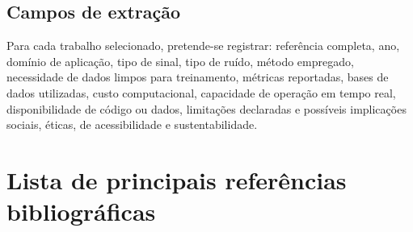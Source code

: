 \subsection{Campos de extração}

Para cada trabalho selecionado, pretende-se registrar: referência completa, ano, domínio de aplicação, tipo de sinal, tipo de ruído, método empregado, necessidade de dados limpos para treinamento, métricas reportadas, bases de dados utilizadas, custo computacional, capacidade de operação em tempo real, disponibilidade de código ou dados, limitações declaradas e possíveis implicações sociais, éticas, de acessibilidade e sustentabilidade.

\section{Lista de principais referências bibliográficas}

